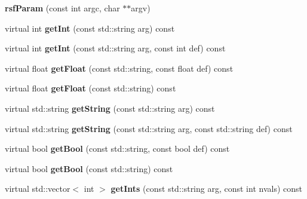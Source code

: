 \begin{DoxyCompactItemize}
\item 
\mbox{\label{classrsf_param_a60165e4ff06d75f61476309e30466451}} 
{\bfseries rsf\+Param} (const int argc, char $\ast$$\ast$argv)
\item 
\mbox{\label{classrsf_param_a3c84b7dbf8b6e93ae95eff29bbbcf115}} 
virtual int {\bfseries get\+Int} (const std\+::string arg) const
\item 
\mbox{\label{classrsf_param_ae13e13c131b701dc3805995ecca20ff9}} 
virtual int {\bfseries get\+Int} (const std\+::string arg, const int def) const
\item 
\mbox{\label{classrsf_param_a8b87bdc54c4c938d09fccacae620d83b}} 
virtual float {\bfseries get\+Float} (const std\+::string, const float def) const
\item 
\mbox{\label{classrsf_param_a950ccf388ba27d3a4296f6983bcd055e}} 
virtual float {\bfseries get\+Float} (const std\+::string) const
\item 
\mbox{\label{classrsf_param_a5966067054f4cb9bf0a53138abb56259}} 
virtual std\+::string {\bfseries get\+String} (const std\+::string arg) const
\item 
\mbox{\label{classrsf_param_a64efac1ff3b777810ffbaec2524657ef}} 
virtual std\+::string {\bfseries get\+String} (const std\+::string arg, const std\+::string def) const
\item 
\mbox{\label{classrsf_param_af71444c488742811f8c2a06c7efc96fe}} 
virtual bool {\bfseries get\+Bool} (const std\+::string, const bool def) const
\item 
\mbox{\label{classrsf_param_a637f117e4ef2b9c09adddc11d5889361}} 
virtual bool {\bfseries get\+Bool} (const std\+::string) const
\item 
\mbox{\label{classrsf_param_af15a6357eeb6a35d8218c0a3feb82f55}} 
virtual std\+::vector$<$ int $>$ {\bfseries get\+Ints} (const std\+::string arg, const int nvals) const
\item 
$$
\end{DoxyCompactItemize}
